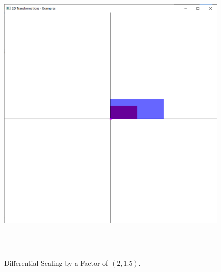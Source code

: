 \documentclass[12pt, a4]{article}
\begin{document}
\subsection*{}
\begin{figure}[h]
\centering
\caption{Differential Scaling by a Factor of $(2, 1.5)$.}
\includegraphics[height=15cm, width=15cm]{Outputs/Output-10.png}
\end{figure}

\newpage
\end{document}
